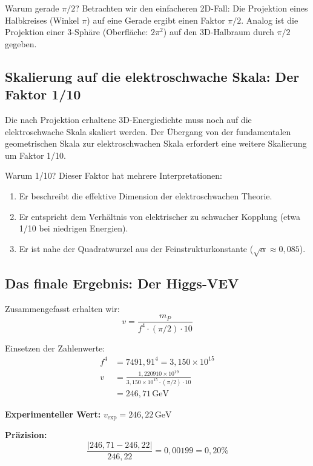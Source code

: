 	Warum gerade \(\pi/2\)? Betrachten wir den einfacheren 2D-Fall: Die Projektion eines Halbkreises (Winkel \(\pi\)) auf eine Gerade ergibt einen Faktor \(\pi/2\). Analog ist die Projektion einer 3-Sphäre (Oberfläche: \(2\pi^2\)) auf den 3D-Halbraum durch \(\pi/2\) gegeben.
	
	\subsection{Skalierung auf die elektroschwache Skala: Der Faktor 1/10}
	
	Die nach Projektion erhaltene 3D-Energiedichte muss noch auf die elektroschwache Skala skaliert werden. Der Übergang von der fundamentalen geometrischen Skala zur elektroschwachen Skala erfordert eine weitere Skalierung um Faktor 1/10.
	
	Warum 1/10? Dieser Faktor hat mehrere Interpretationen:
	\begin{enumerate}
		\item Er beschreibt die effektive Dimension der elektroschwachen Theorie.
		\item Er entspricht dem Verhältnis von elektrischer zu schwacher Kopplung (etwa 1/10 bei niedrigen Energien).
		\item Er ist nahe der Quadratwurzel aus der Feinstrukturkonstante (\(\sqrt{\alpha} \approx 0{,}085\)).
	\end{enumerate}
	
	\subsection{Das finale Ergebnis: Der Higgs-VEV}
	
	Zusammengefasst erhalten wir:
	\begin{equation}
		\boxed{v = \frac{m_P}{f^4 \cdot (\pi/2) \cdot 10}}
	\end{equation}
	
	Einsetzen der Zahlenwerte:
	\begin{align}
		f^4 &= 7491{,}91^4 = 3{,}150 \times 10^{15} \\
		v &= \frac{1{,}220910 \times 10^{19}}{3{,}150 \times 10^{15} \cdot (\pi/2) \cdot 10} \\
		&= 246{,}71\,\text{GeV}
	\end{align}
	
	\textbf{Experimenteller Wert:} \(v_{\exp} = 246{,}22\,\text{GeV}\)
	
	\textbf{Präzision:}
	\begin{equation}
		\frac{|246{,}71 - 246{,}22|}{246{,}22} = 0{,}00199 = 0{,}20\%
	\end{equation}
	
